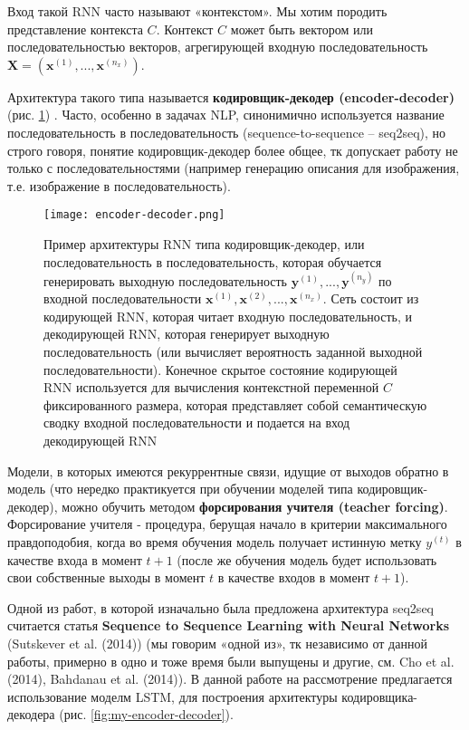 Вход такой RNN часто называют «контекстом». Мы хотим породить представление 
контекста $C$. Контекст $C$ может быть вектором или последовательностью векторов, 
агрегирующей входную последовательность $\bm{X} = (\bm{x}^{(1)}, ..., \bm{x}^{(n_x)})$.

Архитектура такого типа называется \textbf{кодировщик-декодер (encoder-decoder)} 
(рис. \ref{fig:encoder-decoder}) \cite{Goodfellow-et-al-2016}. 
Часто, особенно в задачах NLP, синонимично используется название 
последовательность в последовательность (sequence-to-sequence -- seq2seq), 
но строго говоря, понятие кодировщик-декодер более общее, тк 
допускает работу не только с последовательностями (например генерацию 
описания для изображения, т.е. изображение в последовательность). 

\begin{figure}[h!]
    \centering
    \texttt{[image: encoder-decoder.png]}
    \caption{Пример архитектуры RNN типа кодировщик-декодер, или
    последовательность в последовательность, которая обучается генерировать 
    выходную последовательность $\bm{y}^{(1)}, ..., \bm{y}^{(n_y)}$ по 
    входной последовательности $\bm{x}^{(1)}, \bm{x}^{(2)}, ..., \bm{x}^{(n_x)}$. 
    Сеть состоит из кодирующей RNN, которая читает
    входную последовательность, и декодирующей RNN, которая генерирует
    выходную последовательность (или вычисляет вероятность заданной выходной 
    последовательности). Конечное скрытое состояние кодирующей
    RNN используется для вычисления контекстной переменной $C$ фиксированного 
    размера, которая представляет собой семантическую сводку входной
    последовательности и подается на вход декодирующей RNN}
    \label{fig:encoder-decoder}
\end{figure}

\newpage

Модели, в которых имеются рекуррентные связи, идущие от выходов обратно в 
модель (что нередко практикуется при обучении моделей типа кодировщик-декодер), 
можно обучить методом \textbf{форсирования учителя (teacher forcing)}. Форсирование 
учителя - процедура, берущая начало в критерии максимального правдоподобия,
когда во время обучения модель получает истинную метку $y^{(t)}$ в качестве входа в 
момент $t + 1$ (после же обучения модель будет использовать свои собственные 
выходы в момент $t$ в качестве входов в момент $t + 1$).

Одной из работ, в которой изначально была предложена архитектура 
seq2seq считается статья \textbf{Sequence to Sequence Learning with Neural Networks} 
(Sutskever et al. (2014)) \cite{seq2seq} (мы говорим «одной из», тк независимо 
от данной работы, примерно в одно и тоже время были выпущены и другие, см. Cho et al. (2014), 
Bahdanau et al. (2014)). В данной работе на рассмотрение предлагается использование 
моделм LSTM, для построения архитектуры кодировщика-декодера 
(рис. \ref{fig:my-encoder-decoder}).

